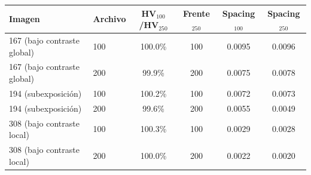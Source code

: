 \begin{tabular}{llcccc}
\hline
\textbf{Imagen} & \textbf{Archivo} & \textbf{HV$_{100}$/HV$_{250}$} & \textbf{Frente$_{250}$} & \textbf{Spacing$_{100}$} & \textbf{Spacing$_{250}$} \\
\hline
167 (bajo contraste global) & 100 & 100.0\% & 100 & 0.0095 & 0.0096 \\
167 (bajo contraste global) & 200 & 99.9\% & 200 & 0.0075 & 0.0078 \\
194 (subexposición) & 100 & 100.2\% & 100 & 0.0072 & 0.0073 \\
194 (subexposición) & 200 & 99.6\% & 200 & 0.0055 & 0.0049 \\
308 (bajo contraste local) & 100 & 100.3\% & 100 & 0.0029 & 0.0028 \\
308 (bajo contraste local) & 200 & 100.0\% & 200 & 0.0022 & 0.0020 \\
\hline
\end{tabular}